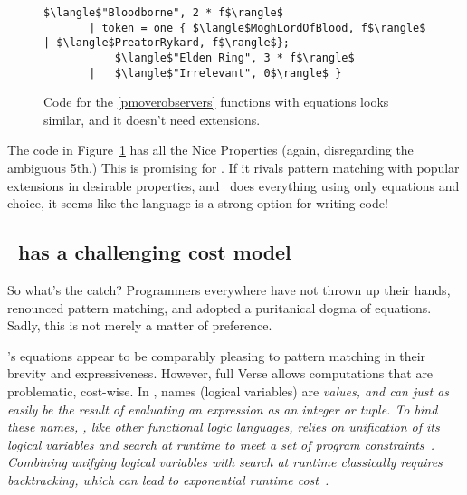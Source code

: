\documentclass[manuscript,screen,review, 12pt, nonacm]{acmart}
\begin{document}
\begin{figure}[ht]
\begin{minipage}[h]{\linewidth}
\begin{lstlisting}[numbers=none, basicstyle=\tiny, xleftmargin=9em, 
                            frame=single, showstringspaces=false]
           $\langle$"Bloodborne", 2 * f$\rangle$
       | token = one { $\langle$MoghLordOfBlood, f$\rangle$ | $\langle$PreatorRykard, f$\rangle$}; 
           $\langle$"Elden Ring", 3 * f$\rangle$
       |   $\langle$"Irrelevant", 0$\rangle$ }
          \end{lstlisting}
            \label{fig:versegot} 
        \vspace{4ex}
        \end{minipage}%
    \caption{Code for the \ref{pmoverobservers} functions with equations looks
    similar, and it doesn't need extensions.}
    \label{fig:verseextfuncs}
      \end{figure}
        
    The code in Figure~\ref{fig:verseextfuncs} has all the Nice Properties
    (again, disregarding the ambiguous 5th.) This is promising for \VC. If it
    rivals pattern matching with popular extensions in desirable properties, and
    \VC\ does everything using only equations and choice, it seems like the
    language is a strong option for writing code! 

    \subsection{\VC\ has a challenging cost model}
    \label{vcbadcost}

    So what's the catch? Programmers everywhere have not thrown up their hands,
    renounced pattern matching, and adopted a puritanical dogma of equations. 
    Sadly, this is not merely a matter of preference. 

    \VC's equations appear to be comparably pleasing to pattern matching in
    their brevity and expressiveness. However, full Verse allows computations
    that are problematic, cost-wise. In \VC, names (logical variables) are
    \it{values}, and can just as easily be the result of evaluating an
    expression as an integer or tuple. To bind these names, \VC, like other
    functional logic languages, relies on \it{unification} of its logical
    variables and \it{search} at runtime to meet a set of program
    constraints~\cite{antoy2010functional, hanus2013functional}. Combining
    unifying logical variables with search at runtime classically requires
    backtracking, which can lead to exponential runtime
    cost~\cite{hanus2013functional, wadler1985replace, clark1982introduction}. 
\end{document}
